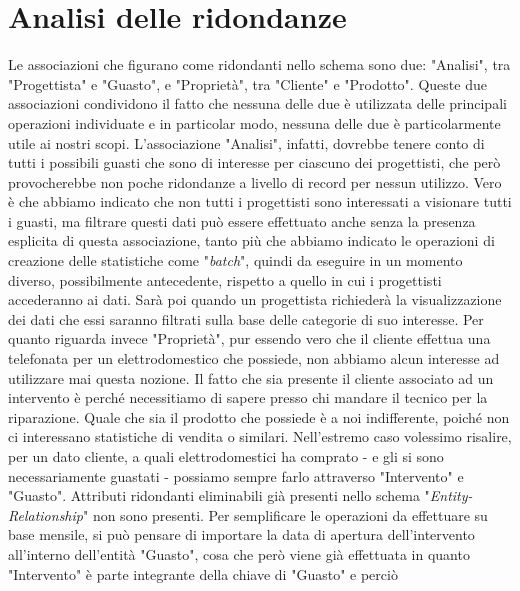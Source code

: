 \documentclass[a4paper, 12pt]{report}
\begin{document}
\newpage

\section{Analisi delle ridondanze}

Le associazioni che figurano come ridondanti nello schema sono due: "Analisi", tra "Progettista" e "Guasto", e "Proprietà", tra "Cliente" e "Prodotto". Queste due associazioni
condividono il fatto che nessuna delle due è utilizzata delle principali operazioni individuate e in particolar modo, nessuna delle due è particolarmente utile ai nostri scopi.\newline
L'associazione "Analisi", infatti, dovrebbe tenere conto di tutti i possibili guasti che sono di interesse per ciascuno dei progettisti, che però provocherebbe non poche ridondanze
a livello di record per nessun utilizzo. Vero è che abbiamo indicato che non tutti i progettisti sono interessati a visionare tutti i guasti, ma filtrare questi dati può essere effettuato
anche senza la presenza esplicita di questa associazione, tanto più che abbiamo indicato le operazioni di creazione delle statistiche come "\textit{batch}", quindi da eseguire in
un momento diverso, possibilmente antecedente, rispetto a quello in cui i progettisti accederanno ai dati. Sarà poi quando un progettista richiederà la visualizzazione dei dati che
essi saranno filtrati sulla base delle categorie di suo interesse.\newline
Per quanto riguarda invece "Proprietà", pur essendo vero che il cliente effettua una telefonata per un elettrodomestico che possiede, non abbiamo alcun interesse ad utilizzare mai
questa nozione. Il fatto che sia presente il cliente associato ad un intervento è perché necessitiamo di sapere presso chi mandare il tecnico per la riparazione. Quale che sia il prodotto
che possiede è a noi indifferente, poiché non ci interessano statistiche di vendita o similari. Nell'estremo caso volessimo risalire, per un dato cliente, a quali elettrodomestici
ha comprato - e gli si sono necessariamente guastati - possiamo sempre farlo attraverso "Intervento" e "Guasto".\newline
Attributi ridondanti eliminabili già presenti nello schema "\textit{Entity-Relationship}" non sono presenti. Per semplificare le operazioni da effettuare su base mensile, si può pensare di importare la data di apertura dell'intervento all'interno dell'entità "Guasto", cosa che però viene già effettuata in quanto "Intervento" è parte integrante della chiave di "Guasto" e perciò
\end{document}
